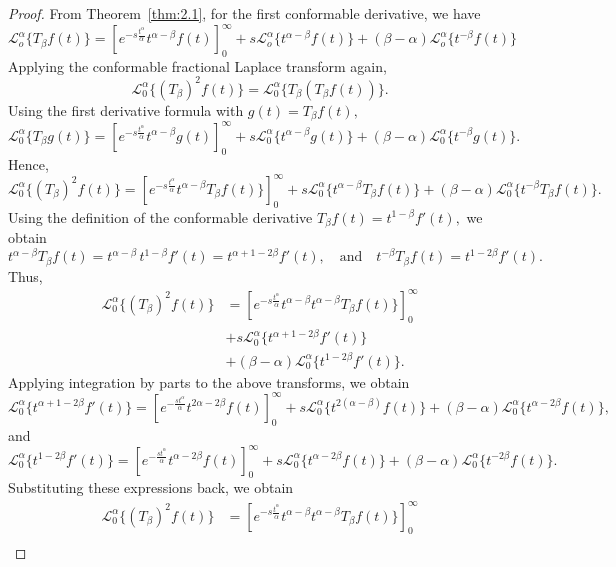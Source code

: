 \documentclass[two side,reqno,12pt]{amsart}
\numberwithin{equation}{section}
\theoremstyle{definition}
\begin{document}
\begin{proof}
    From Theorem~\ref{thm:2.1}, for the first conformable derivative, we have
    \[
\mathcal{L}_{o}^{\alpha}\{T_{\beta}f(t)\}
= \left[e^{-s\frac{t^{\alpha}}{\alpha}}t^{\alpha-\beta}f(t)\right]_{0}^{\infty}+
s\mathcal{L}_{o}^{\alpha}\{t^{\alpha-\beta}f(t)\}
+
(\beta-\alpha)\mathcal{L}_{o}^{\alpha}\{t^{-\beta}f(t)\}
\]  
Applying the conformable fractional Laplace transform again,
\[
\mathcal{L}_0^{\alpha}\{(T_{\beta})^{2}f(t)\}
=
\mathcal{L}_0^{\alpha}\{T_{\beta}(T_{\beta}f(t))\}.
\]
Using the first derivative formula with
\(
g(t)=T_{\beta}f(t),
\)
\[
\mathcal{L}_0^{\alpha}\{T_{\beta}g(t)\}
= \left[e^{-s\frac{t^{\alpha}}{\alpha}}t^{\alpha-\beta}g(t)\right]_{0}^{\infty}+
s\mathcal{L}_0^{\alpha}\{t^{\alpha-\beta}g(t)\}
+
(\beta-\alpha)\mathcal{L}_0^{\alpha}\{t^{-\beta}g(t)\}.
\]
Hence,
\[
\mathcal{L}_0^{\alpha}\{(T_{\beta})^{2}f(t)\}
= \left[e^{-s\frac{t^{\alpha}}{\alpha}}t^{\alpha-\beta}T_{\beta}f(t)\}\right]_{0}^{\infty}+
s\mathcal{L}_0^{\alpha}\{t^{\alpha-\beta}T_{\beta}f(t)\}
+
(\beta-\alpha)\mathcal{L}_0^{\alpha}\{t^{-\beta}T_{\beta}f(t)\}.
\]
Using the definition of the conformable derivative
\(
T_{\beta}f(t)=t^{1-\beta}f'(t),
\)
we obtain
\[
t^{\alpha-\beta}T_{\beta}f(t)
=t^{\alpha-\beta}\,t^{1-\beta}f'(t)=t^{\alpha+1-2\beta}f'(t),
\quad\text{and}\quad t^{-\beta}T_{\beta}f(t) = t^{1-2\beta}f'(t).
\]
Thus,
\begin{align*}
\mathcal{L}_0^{\alpha}\{(T_{\beta})^{2}f(t)\}
&= \left[e^{-s\frac{t^{\alpha}}{\alpha}}t^{\alpha-\beta}t^{\alpha-\beta}T_{\beta}f(t)\}\right]_{0}^{\infty}\\
& +
s\mathcal{L}_0^{\alpha}\{t^{\alpha+1-2\beta}f'(t)\}\\
&+
(\beta-\alpha)\mathcal{L}_0^{\alpha}\{t^{1-2\beta}f'(t)\}.
\end{align*}
Applying integration by parts to the above transforms, we obtain
\[
\mathcal{L}_0^{\alpha}\{t^{\alpha+1-2\beta}f'(t)\}
=
\left[e^{-\frac{s t^{\alpha}}{\alpha}} t^{2\alpha-2\beta}f(t)\right]_{0}^{\infty}
+s\mathcal{L}_0^{\alpha}\{t^{2(\alpha-\beta)}f(t)\}
+(\beta-\alpha)\mathcal{L}_0^{\alpha}\{t^{\alpha-2\beta}f(t)\},
\]
and
\[
\mathcal{L}_0^{\alpha}\{t^{1-2\beta}f'(t)\}
=
\left[e^{-\frac{s t^{\alpha}}{\alpha}} t^{\alpha-2\beta}f(t)\right]_{0}^{\infty}
+s\mathcal{L}_0^{\alpha}\{t^{\alpha-2\beta}f(t)\}
+(\beta-\alpha)\mathcal{L}_0^{\alpha}\{t^{-2\beta}f(t)\}.
\]
Substituting these expressions back, we obtain
\begin{align*}
\mathcal{L}_0^{\alpha}\{(T_{\beta})^{2}f(t)\}
&= \left[e^{-s\frac{t^{\alpha}}{\alpha}}t^{\alpha-\beta}t^{\alpha-\beta}T_{\beta}f(t)\}\right]_{0}^{\infty}\\

\end{align*}
\end{proof}
\end{document}
